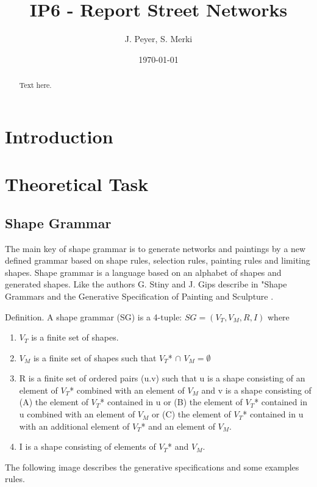 \documentclass[11pt, a4paper]{report}
\begin{document}
\begin{titlepage}
    \title{IP6 - Report Street Networks}
    \date{\today}
    \author{J. Peyer, S. Merki}
    \maketitle
\end{titlepage}
\setcounter{page}{1}

\tableofcontents



\begin{abstract}
    Text here.
\end{abstract}

\chapter{Introduction}

\chapter{Theoretical Task}
\section{Shape Grammar}
The main key of shape grammar is to generate networks and paintings by a new defined grammar based on shape rules, selection rules, painting rules and limiting shapes. Shape grammar is a language based on an alphabet of shapes and generated shapes. Like the authors G. Stiny and J. Gips describe in "Shape Grammars and the Generative Specification of Painting and Sculpture  \citep{shapeGrammars:1972}.
\begin{displayquote}
    Definition. A shape grammar (SG) is a 4-tuple: $SG = (V_T, V_M, R, I)$ where
    \begin{enumerate}
        \item $V_T$ is a finite set of shapes.
        \item $V_M$ is a finite set of shapes such that $V_T $* $\cap$  $V_M = \emptyset$
        \item R is a finite set of ordered pairs (u.v) such that u is a shape consisting of an element of $V_T $* combined with an element of $V_M$ and v is a shape consisting of (A) the element of $V_T $* contained in u or (B) the element of $V_T $* contained in u combined with an element of $V_M$ or (C) the element of $V_T $* contained in u with an additional element of $V_T$* and an element of $V_M$.
        \item I is a shape consisting of elements of $V_T $* and $V_M$.
    \end{enumerate}
\end{displayquote}
The following image describes the generative specifications and some examples rules.
\pagebreak
\end{document}
